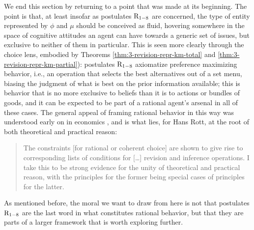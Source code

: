 We end this section by returning to a point that was made at its beginning.
The point is that, at least insofar as postulates $\mathrm{R}_{1-8}$ are concerned,
the type of entity represented by $\phi$ and $\mu$
should be conceived as fluid, hovering somewhere in 
the space of cognitive attitudes an agent can have towards a generic set of issues,
but exclusive to neither of them in particular.
This is seen more clearly through the choice lens, 
embodied by Theorems \ref{thm:3-revision-repr-km-total} and \ref{thm:3-revision-repr-km-partial}):
postulates $\mathrm{R}_{1-8}$ axiomatize preference maximizing behavior,
i.e., an operation that selects the best alternatives out of a 
set menu, biasing the judgment of what is best on the prior information available; 
this is behavior that is no more exclusive to beliefs than it is to actions
or bundles of goods, and it can be expected to be part of a rational agent's arsenal
in all of these cases.
The general appeal of framing rational behavior in this way
was understood early on in economics 
\cite{Nash1950,Arrow51,Chernoff54,RadnerM54,LuceR57,Hansson68,Sen69,Sen70,Herzberger73},
and is what lies, for Hans Rott, at the root of both theoretical and practical reason:

\begin{quote}
	The constraints [for rational or coherent choice]
	are shown to give rise to corresponding lists of  
	conditions for [\dots] revision and inference operations. 
	I take this to be strong evidence for the unity of 
	theoretical and practical reason, with the principles for 
	the former being special cases of principles for the latter. 
	\cite[p.~214]{Rott92}
\end{quote}

As mentioned before, the moral we want to draw from here 
is not that postulates $\mathrm{R}_{1-8}$ are the last word in 
what constitutes rational behavior, but that they 
are parts of a larger framework that is worth exploring further.































